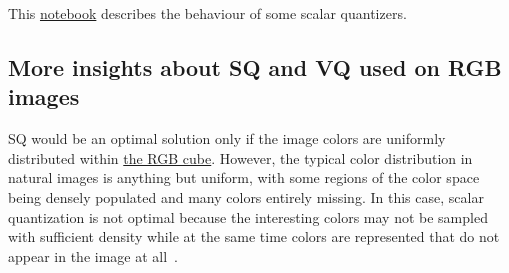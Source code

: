\begin{comment}
\begin{figure}
  \centering
  \myfig{io_map_mr}{5cm}{500}
  \caption{Input/output mapping of a mid-riser quantizer with $\Delta=2$.}
  \label{fig:iomap_mr}
\end{figure}

\begin{figure}
  \centering
  \myfig{qe_mr}{5cm}{500}
  \caption{Quantization error of a mid-riser quantizer with $\Delta=2$.}
  \label{fig:qe_mr}
\end{figure}

\begin{figure}
  \centering
  \myfig{io_map_mt}{5cm}{500}
  \caption{Input/output map of a mid-tread quantizer with $\Delta=2$.}
  \label{fig:iomap_mt}
\end{figure}

\begin{figure}
  \centering
  \myfig{qe_mt}{5cm}{500}
  \caption{Quantization error of a mid-tread quantizer with $\Delta=2$.}
  \label{fig:qe_mt}
\end{figure}

\begin{figure}
  \centering
  \myfig{io_map_dz}{5cm}{500}
  \caption{Input/output map of a dead-zone quantizer with $\Delta=2$.}
  \label{fig:iomap_dz}
\end{figure}

\begin{figure}
  \centering
  \myfig{qe_dz}{5cm}{500}
  \caption{Quantization error of a dead-zone quantizer with $\Delta=2$.}
  \label{fig:qe_dz}
\end{figure}
\end{comment}

This
\href{https://github.com/vicente-gonzalez-ruiz/quantization/blob/master/digital_quantization.ipynb}{notebook}
describes the behaviour of some scalar quantizers.

\subsection{More insights about SQ and VQ used on RGB images}
SQ would be an optimal solution only if the image colors are uniformly
distributed within
\href{https://en.wikipedia.org/wiki/RGB_color_model}{the RGB
  cube}. However, the typical color distribution in natural images is
anything but uniform, with some regions of the color space being
densely populated and many colors entirely missing. In this case,
scalar quantization is not optimal because the interesting colors may
not be sampled with suﬃcient density while at the same time colors are
represented that do not appear in the image at
all~\cite{burger2016digital}.

